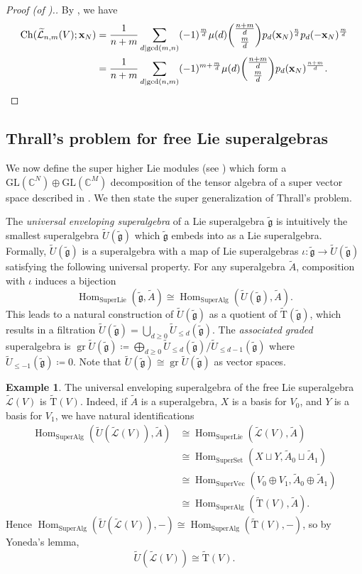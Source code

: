 \documentclass[11pt]{article}
\theoremstyle{definition}
\newtheorem{exam}[theo]{Example}
\numberwithin{equation}{section}
\DeclareMathOperator{\gr}{gr}
\DeclareMathOperator{\Hom}{Hom}
\newcommand\CC{\mathbb{C}}
\newcommand{\fgtil}{\widetilde{\mathfrak{g}}}
\newcommand\ch{\Ch}
\newcommand\GL{\mathrm{GL}}
\newcommand\Trm{\mathrm{T}}
\newcommand\xb{\mathbf{x}}
\newcommand\Atil{\widetilde{A}}
\newcommand\Ltil{\widetilde{\mathcal{L}}}
\newcommand\Util{\widetilde{U}}
\newcommand\Trmtil{\widetilde{\Trm}}
\newcommand\Ch{\mathrm{Ch}}
\begin{document}
\begin{proof}[Proof (of ).]
By , we have
\begin{align*}
\ch(\Ltil_{n,m}(V);\xb_N) &= \frac{1}{n+m} \sum_{d \mid \gcd(m,n)} (-1)^\frac{m}{d} \mu(d) \binom{\frac{n+m}{d}}{\frac{m}{d}} p_d(\xb_N)^\frac{n}{d}p_d(-\xb_N)^\frac{m}{d} \\
&= \frac{1}{n+m} \sum_{d \mid \gcd(n,m)} (-1)^{m + \frac{m}{d}} \mu(d) \binom{\frac{n+m}{d}}{\frac{m}{d}} p_d(\xb_N)^\frac{n+m}{d}. \qedhere
\end{align*}
\end{proof}

\subsection{Thrall's problem for free Lie superalgebras}\label{sec:super-Thrall}
We now define the super higher Lie modules (see ) which form a $\GL(\CC^N) \oplus \GL(\CC^M)$ decomposition of the tensor algebra of a super vector space described in . We then state the super generalization of Thrall's problem.

The \textit{universal enveloping superalgebra} of a Lie superalgebra $\fgtil$ is intuitively the smallest superalgebra $\Util(\fgtil)$ which $\fgtil$ embeds into as a Lie superalgebra. Formally, $\Util(\fgtil)$ is a superalgebra with a map of Lie superalgebras $\iota \colon \fgtil \to \Util(\fgtil)$ satisfying the following universal property. For any superalgebra $\Atil$, composition with $\iota$ induces a bijection
  \[ \Hom_{\textrm{SuperLie}}(\fgtil, \Atil) \cong \Hom_{\textrm{SuperAlg}}(\Util(\fgtil), \Atil). \]
This leads to a natural construction of $\Util(\fgtil)$ as a quotient of $\Trmtil(\fgtil)$, which results in a filtration $\Util(\fgtil) = \bigcup_{d \geq 0} \Util_{\leq d}(\fgtil)$. The \textit{associated graded} superalgebra is $\gr \Util(\fgtil) \coloneqq \bigoplus_{d \geq 0} \Util_{\leq d}(\fgtil)/\Util_{\leq d-1}(\fgtil)$ where $\Util_{\leq -1}(\fgtil) \coloneqq 0$. Note that $\Util(\fgtil) \cong \gr \Util(\fgtil)$ as vector spaces.

\begin{exam}\label{ex:U-of-free}
    The universal enveloping superalgebra of the free Lie superalgebra $\Ltil(V)$ is $\Trmtil(V)$. Indeed, if $\Atil$ is a superalgebra, $X$ is a basis for $V_0$, and $Y$ is a basis for $V_1$, we have natural identifications
    \begin{align*}
        \Hom_{\text{SuperAlg}}(\Util(\Ltil(V)), \Atil)
          &\cong \Hom_{\text{SuperLie}}(\Ltil(V), \Atil) \\
          &\cong \Hom_{\text{SuperSet}}(X \sqcup Y, \Atil_0 \sqcup \Atil_1) \\
          &\cong \Hom_{\text{SuperVec}}(V_0 \oplus V_1, \Atil_0 \oplus \Atil_1) \\
          &\cong \Hom_{\text{SuperAlg}}(\Trmtil(V), \Atil).
    \end{align*}
    Hence $\Hom_{\text{SuperAlg}}(\Util(\Ltil(V)), -) \cong \Hom_{\text{SuperAlg}}(\Trmtil(V), -)$, so by Yoneda's lemma,
      \[ \Util(\Ltil(V)) \cong \Trmtil(V). \]
\end{exam}
\end{document}
